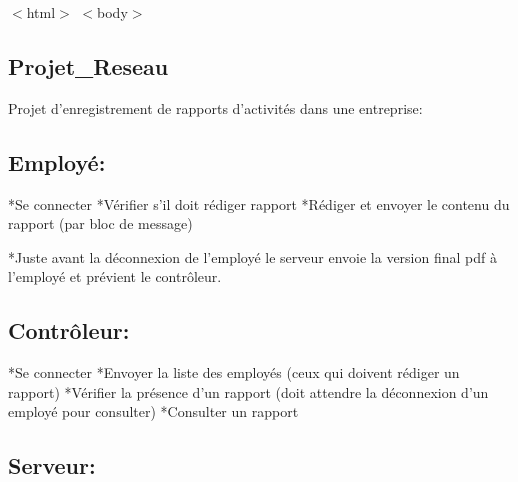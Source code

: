 $<$html$>$ $<$body$>$ 
\begin{DoxyPre}
\section*{Projet\_Reseau}\end{DoxyPre}



\begin{DoxyPre}
Projet d'enregistrement de rapports d'activités dans une entreprise:\end{DoxyPre}



\begin{DoxyPre}\subsection*{Employé:}\end{DoxyPre}



\begin{DoxyPre}
*Se connecter
*Vérifier s'il doit rédiger rapport
*Rédiger et envoyer le contenu du rapport (par bloc de message)\end{DoxyPre}



\begin{DoxyPre}*Juste avant la déconnexion de l'employé le serveur envoie la version final pdf
à l'employé et prévient le contrôleur.
\subsection*{Contrôleur:}\end{DoxyPre}



\begin{DoxyPre}
*Se connecter
*Envoyer la liste des employés (ceux qui doivent rédiger un rapport)
*Vérifier la présence d'un rapport (doit attendre la déconnexion d'un employé pour consulter)
*Consulter un rapport\end{DoxyPre}



\begin{DoxyPre}\subsection*{Serveur:}\end{DoxyPre}



